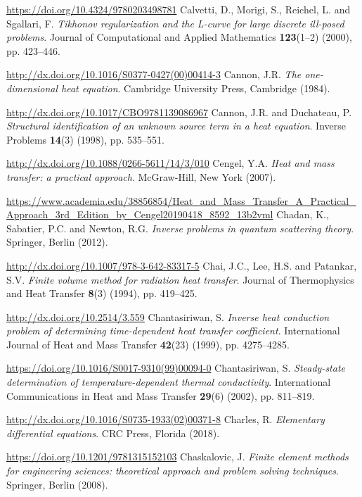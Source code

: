 \begin{thebibliography}{301}
\url{https://doi.org/10.4324/9780203498781}
%
%
 Calvetti, D., Morigi, S., Reichel, L. and Sgallari, F. {\it Tikhonov regularization and the L-curve for large discrete ill-posed problems}. Journal of Computational and Applied Mathematics {\bf 123}(1--2) (2000), pp. 423--446. 

\url{http://dx.doi.org/10.1016/S0377-0427(00)00414-3}
%
%
 Cannon, J.R. {\it The one-dimensional heat equation}. Cambridge University Press, Cambridge (1984). 

\url{http://dx.doi.org/10.1017/CBO9781139086967}
%
%
 Cannon, J.R. and Duchateau, P. {\it Structural identification of an unknown source term in a heat equation}. Inverse Problems {\bf 14}(3) (1998), pp. 535--551.

\url{http://dx.doi.org/10.1088/0266-5611/14/3/010}
%
%
 Cengel, Y.A. {\it Heat and mass transfer: a practical approach}. McGraw-Hill, New York (2007). 

\url{https://www.academia.edu/38856854/Heat_and_Mass_Transfer_A_Practical_Approach_3rd_Edition_by_Cengel20190418_8592_13b2vml}
%
%
 Chadan, K., Sabatier, P.C. and Newton, R.G. {\it Inverse problems in quantum scattering theory}. Springer, Berlin (2012). 

\url{http://dx.doi.org/10.1007/978-3-642-83317-5}
%
%
 Chai, J.C., Lee, H.S. and Patankar, S.V. {\it Finite volume method for radiation heat transfer}. Journal of Thermophysics and Heat Transfer {\bf 8}(3) (1994), pp. 419--425.

\url{http://dx.doi.org/10.2514/3.559}
%
%
 Chantasiriwan, S. {\it Inverse heat conduction problem of determining time-dependent heat transfer coefficient}. International Journal of Heat and Mass Transfer {\bf 42}(23) (1999), pp. 4275--4285.

\url{https://doi.org/10.1016/S0017-9310(99)00094-0}
%
%
 Chantasiriwan, S. {\it Steady-state determination of temperature-dependent thermal conductivity}. International Communications in Heat and Mass Transfer {\bf 29}(6) (2002), pp. 811--819.

\url{http://dx.doi.org/10.1016/S0735-1933(02)00371-8}
%
%
 Charles, R. {\it Elementary differential equations}. CRC Press, Florida (2018). 

\url{https://doi.org/10.1201/9781315152103}
%
%
 Chaskalovic, J. {\it Finite element methods for engineering sciences: theoretical approach and problem solving techniques}. Springer, Berlin (2008). 


\end{thebibliography}

